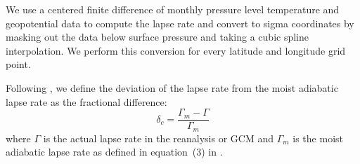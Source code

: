 \documentclass{ametsocV5}
\begin{document}





%
%

\appendix[A]
We use a centered finite difference of monthly pressure level temperature and geopotential data to compute the lapse rate and convert to sigma coordinates by masking out the data below surface pressure and taking a cubic spline interpolation. We perform this conversion for every latitude and longitude grid point. 

Following \cite{stone1979}, we define the deviation of the lapse rate from the moist adiabatic lapse rate as the fractional difference:
  \begin{equation}
    \delta_{c} = \frac{\Gamma_{m}-\Gamma}{\Gamma_{m}}
  \end{equation}
where $\Gamma$ is the actual lapse rate in the reanalysis or GCM and $\Gamma_m$ is the moist adiabatic lapse rate as defined in equation~(3) in \cite{stone1979}.
\end{document}
